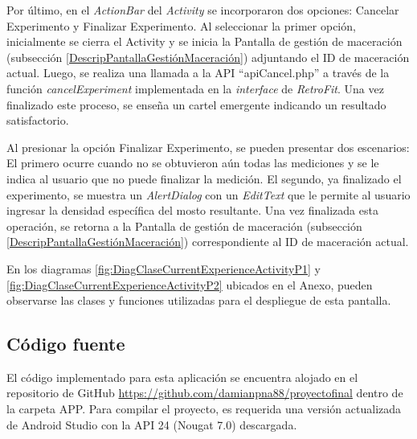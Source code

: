             \par Por último, en el \textit{ActionBar} del \textit{Activity} se incorporaron dos opciones: Cancelar Experimento y Finalizar Experimento. Al seleccionar la primer opción, inicialmente se cierra el Activity y se inicia la Pantalla de gestión de maceración (subsección \ref{DescripPantallaGestiónMaceración}) adjuntando el ID de maceración actual. Luego, se realiza una llamada a la API ``apiCancel.php'' a través de la función \textit{cancelExperiment} implementada en la \textit{interface} de \textit{RetroFit}. Una vez finalizado este proceso, se enseña un cartel emergente indicando un resultado satisfactorio.
            
            \par Al presionar la opción Finalizar Experimento, se pueden presentar dos escenarios: El primero ocurre cuando no se obtuvieron aún todas las mediciones y se le indica al usuario que no puede finalizar la medición. El segundo, ya finalizado el experimento, se muestra un \textit{AlertDialog} con un \textit{EditText} que le permite al usuario ingresar la densidad específica del mosto resultante. Una vez finalizada esta operación, se retorna a la Pantalla de gestión de maceración (subsección \ref{DescripPantallaGestiónMaceración}) correspondiente al ID de maceración actual.
            
            \par En los diagramas \ref{fig:DiagClaseCurrentExperienceActivityP1} y \ref{fig:DiagClaseCurrentExperienceActivityP2} ubicados en el Anexo, pueden observarse las clases y funciones utilizadas para el despliegue de esta pantalla.
            
    \subsection{Código fuente}
    \par El código implementado para esta aplicación se encuentra alojado en el repositorio de GitHub \url{https://github.com/damianpna88/proyectofinal} dentro de la carpeta APP. Para compilar el proyecto, es requerida una versión actualizada de Android Studio con la API 24 (Nougat 7.0) descargada.